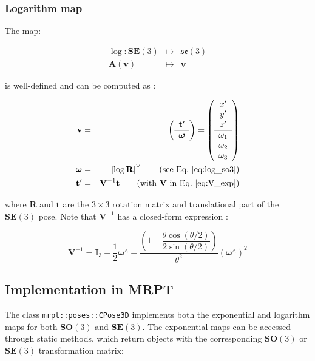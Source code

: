 \documentclass[a4paper,11pt]{report}
\newcommand{\W}{{\bm{\omega}}}
\newcommand{\hatop}[1]{#1^\wedge}
\begin{document}
\subsubsection{Logarithm map}

The map:

\begin{eqnarray}
  \log: \mathbf{SE}(3) &\mapsto& \mathfrak{se}(3) \\
  \mathbf{A}(\mathbf{v})  & \mapsto & \mathbf{v}
\nonumber
\end{eqnarray}

\noindent is well-defined and can be computed as \cite{wang2008nps}:

\begin{eqnarray}
\label{eq:rodrigues_ln_se3}
\mathbf{v} &=&
\left(
\begin{array}{c}
 \mathbf{t}' \\ \hline \W
\end{array}
\right)
=
\left(
\begin{array}{c}
 x'\\y'\\z' \\ \hline \omega_1 \\ \omega_2 \\ \omega_3
\end{array}
\right)
\nonumber \\
\W &=& \left[ \log \mathbf{R} \right]^\vee  \quad \quad \text{(see Eq.~\ref{eq:log_so3})}
\\
\mathbf{t}' &=& \mathbf{V}^{-1} \mathbf{t} \quad \quad \text{(with $\mathbf{V}$ in Eq.~\ref{eq:V_exp})}
\end{eqnarray}

\noindent where $\mathbf{R}$ and $\mathbf{t}$ are the $3 \times 3$ rotation matrix
and translational part of the $\mathbf{SE}(3)$ pose.
Note that $\mathbf{V}^{-1}$ has a closed-form expression \cite{gallier2003computing}:

\begin{equation}
\mathbf{V}^{-1} = \mathbf{I}_3 
- \dfrac{1}{2} \hatop{\W} + 
\dfrac{\left(
 1 - \dfrac{ \theta \cos(\theta/2)}{2 \sin(\theta / 2)}
\right) 
}{\theta^2}  (\hatop{\W})^2
\end{equation}


\subsection{Implementation in MRPT}

The class \texttt{mrpt::poses::CPose3D} implements both the exponential and logarithm
maps for both $\mathbf{SO}(3)$ and $\mathbf{SE}(3)$.
The exponential maps can be accessed through static methods, which return objects
with the corresponding $\mathbf{SO}(3)$ or $\mathbf{SE}(3)$ transformation matrix:
\end{document}
